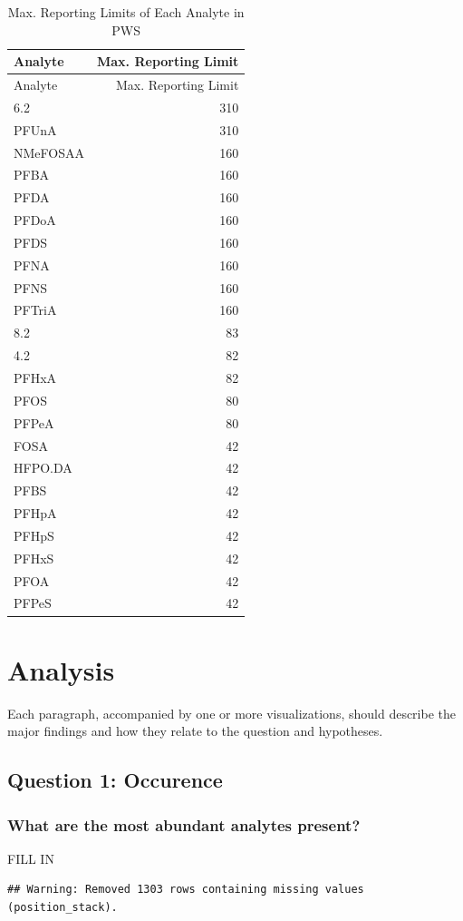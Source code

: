 \documentclass[
  12pt,
]{article}
\begin{document}
\begin{longtable}[]{@{}lr@{}}
\caption{Max. Reporting Limits of Each Analyte in PWS}\tabularnewline
\toprule
Analyte & Max. Reporting Limit\tabularnewline
\midrule
\endfirsthead
\toprule
Analyte & Max. Reporting Limit\tabularnewline
\midrule
\endhead
6.2 & 310\tabularnewline
PFUnA & 310\tabularnewline
NMeFOSAA & 160\tabularnewline
PFBA & 160\tabularnewline
PFDA & 160\tabularnewline
PFDoA & 160\tabularnewline
PFDS & 160\tabularnewline
PFNA & 160\tabularnewline
PFNS & 160\tabularnewline
PFTriA & 160\tabularnewline
8.2 & 83\tabularnewline
4.2 & 82\tabularnewline
PFHxA & 82\tabularnewline
PFOS & 80\tabularnewline
PFPeA & 80\tabularnewline
FOSA & 42\tabularnewline
HFPO.DA & 42\tabularnewline
PFBS & 42\tabularnewline
PFHpA & 42\tabularnewline
PFHpS & 42\tabularnewline
PFHxS & 42\tabularnewline
PFOA & 42\tabularnewline
PFPeS & 42\tabularnewline
\bottomrule
\end{longtable}

\newpage

\hypertarget{analysis}{%
\section{Analysis}\label{analysis}}

Each paragraph, accompanied by one or more visualizations, should
describe the major findings and how they relate to the question and
hypotheses.

\hypertarget{question-1-occurence}{%
\subsection{Question 1: Occurence}\label{question-1-occurence}}

\hypertarget{what-are-the-most-abundant-analytes-present}{%
\subsubsection{What are the most abundant analytes
present?}\label{what-are-the-most-abundant-analytes-present}}

FILL IN

\begin{verbatim}
## Warning: Removed 1303 rows containing missing values (position_stack).
\end{verbatim}
\end{document}

